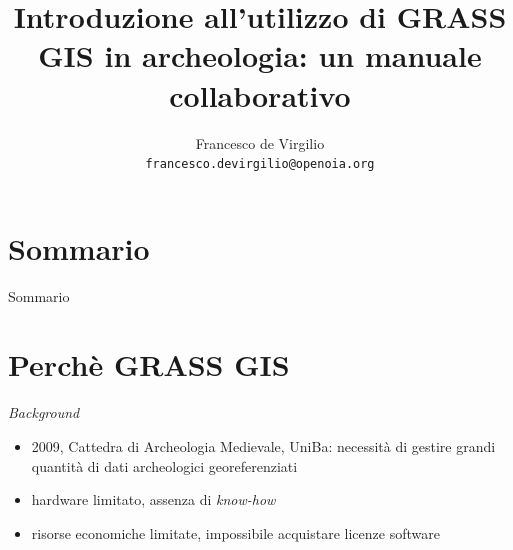 \documentclass[xcolor=svgnames]{beamer}
\title[Introduzione a GRASS in archeologia]{Introduzione all'utilizzo di GRASS GIS in archeologia: un manuale collaborativo}
\author[Francesco de Virgilio]{Francesco de Virgilio \\ \texttt{\tiny francesco.devirgilio@openoia.org}}
\institute[Università degli Studi di Bari]{
	O.I.A. --- Open Idea for Archaeology\\
	\emph{Università degli Studi di Bari}}
\begin{document}

	{
	\begin{frame}
		\titlepage
	\end{frame}
	}

	\section*{Sommario}

		\begin{frame}{Sommario}
			\begin{multicols}{2}
				\tableofcontents
			\end{multicols}
		\end{frame}
		
	\section{Perchè GRASS GIS}

		\begin{frame}{\textit{Background}}
			\begin{itemize}
				\item 2009, Cattedra di Archeologia Medievale, UniBa: necessità di gestire grandi quantità di dati archeologici georeferenziati
				\item hardware limitato, assenza di \textit{know-how}
				\item risorse economiche limitate, impossibile acquistare licenze software
			\end{itemize}
		\end{frame}
\end{document}
